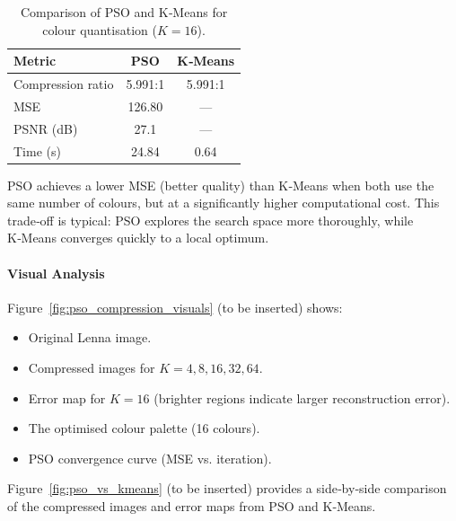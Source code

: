 \begin{table}[H]
\centering
\caption{Comparison of PSO and K‑Means for colour quantisation ($K=16$).}
\label{tab:pso_vs_kmeans}
\begin{tabular}{l c c}
\hline
\textbf{Metric} & \textbf{PSO} & \textbf{K‑Means} \\
\hline
Compression ratio & 5.991:1 & 5.991:1 \\
MSE & 126.80 & — \\
PSNR (dB) & 27.1 & — \\
Time (s) & 24.84 & 0.64 \\
\hline
\end{tabular}
\end{table}

PSO achieves a lower MSE (better quality) than K‑Means when both use the same number of colours, but at a significantly higher computational cost. This trade‑off is typical: PSO explores the search space more thoroughly, while K‑Means converges quickly to a local optimum.

\paragraph{Visual Analysis}
Figure~\ref{fig:pso_compression_visuals} (to be inserted) shows:
\begin{itemize}
    \item Original Lenna image.
    \item Compressed images for $K=4,8,16,32,64$.
    \item Error map for $K=16$ (brighter regions indicate larger reconstruction error).
    \item The optimised colour palette (16 colours).
    \item PSO convergence curve (MSE vs. iteration).
\end{itemize}

Figure~\ref{fig:pso_vs_kmeans} (to be inserted) provides a side‑by‑side comparison of the compressed images and error maps from PSO and K‑Means.

